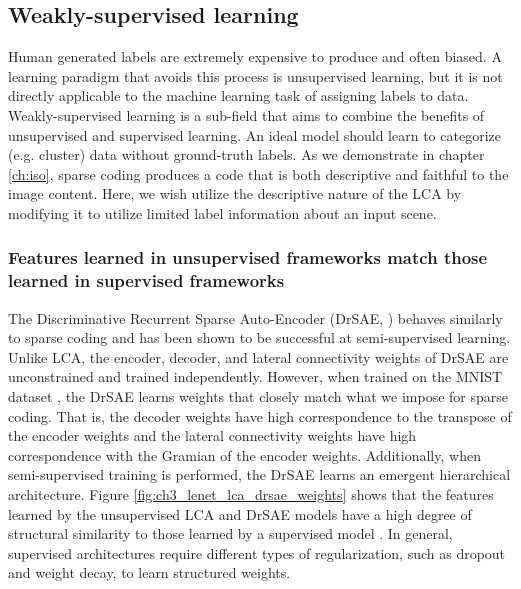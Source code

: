 \subsection{Weakly-supervised learning}

Human generated labels are extremely expensive to produce and often biased. A learning paradigm that avoids this process is unsupervised learning, but it is not directly applicable to the machine learning task of assigning labels to data. Weakly-supervised learning is a sub-field that aims to combine the benefits of unsupervised and supervised learning. An ideal model should learn to categorize (e.g. cluster) data without ground-truth labels. As we demonstrate in chapter \ref{ch:iso}, sparse coding produces a code that is both descriptive and faithful to the image content. Here, we wish utilize the descriptive nature of the LCA by modifying it to utilize limited label information about an input scene.

\subsubsection{Features learned in unsupervised frameworks match those learned in supervised frameworks}
The Discriminative Recurrent Sparse Auto-Encoder (DrSAE, \cite{rolfe2013discriminative}) behaves similarly to sparse coding and has been shown to be successful at semi-supervised learning. Unlike LCA, the encoder, decoder, and lateral connectivity weights of DrSAE are unconstrained and trained independently. However, when trained on the MNIST dataset \parencite{lecun1998mnist}, the DrSAE learns weights that closely match what we impose for sparse coding. That is, the decoder weights have high correspondence to the transpose of the encoder weights and the lateral connectivity weights have high correspondence with the Gramian of the encoder weights. Additionally, when semi-supervised training is performed, the DrSAE learns an emergent hierarchical architecture. Figure \ref{fig:ch3_lenet_lca_drsae_weights} shows that the features learned by the unsupervised LCA and DrSAE models have a high degree of structural similarity to those learned by a supervised model \parencite{lecun1998gradient}. In general, supervised architectures require different types of regularization, such as dropout and weight decay, to learn structured weights.

